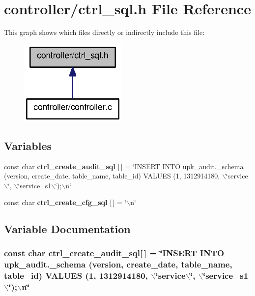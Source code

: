 \section{controller/ctrl\_\-sql.h File Reference}
\label{ctrl__sql_8h}
This graph shows which files directly or indirectly include this file:
\nopagebreak
\begin{figure}[H]
\begin{center}
\leavevmode
\includegraphics[width=150pt]{ctrl__sql_8h__dep__incl}
\end{center}
\end{figure}
\subsection*{Variables}
\begin{DoxyCompactItemize}
\item 
const char {\bf ctrl\_\-create\_\-audit\_\-sql} [$\,$] = \char`\"{}INSERT INTO upk\_\-audit.\_\-schema (version, create\_\-date, table\_\-name, table\_\-id) VALUES (1, 1312914180, $\backslash$\char`\"{}service$\backslash$\char`\"{}, $\backslash$\char`\"{}service\_\-s1$\backslash$\char`\"{});$\backslash$n\char`\"{}
\item 
const char {\bf ctrl\_\-create\_\-cfg\_\-sql} [$\,$] = \char`\"{}$\backslash$n\char`\"{}
\end{DoxyCompactItemize}


\subsection{Variable Documentation}
\subsubsection[{ctrl\_\-create\_\-audit\_\-sql}]{\setlength{\rightskip}{0pt plus 5cm}const char {\bf ctrl\_\-create\_\-audit\_\-sql}[$\,$] = \char`\"{}INSERT INTO upk\_\-audit.\_\-schema (version, create\_\-date, table\_\-name, table\_\-id) VALUES (1, 1312914180, $\backslash$\char`\"{}service$\backslash$\char`\"{}, $\backslash$\char`\"{}service\_\-s1$\backslash$\char`\"{});$\backslash$n\char`\"{}}\label{ctrl__sql_8h_a3ebcd9a8a392c792410a8ecc21ee75cf}


